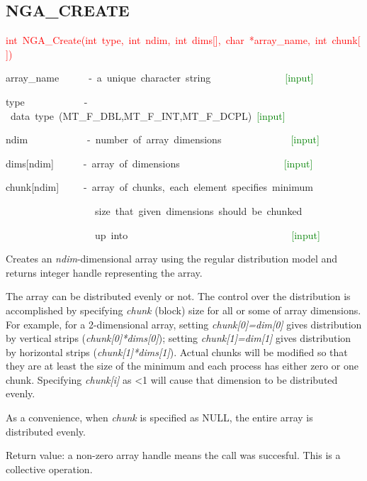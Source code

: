 \subsection*{\label{sub:NGA_CREATE}NGA\_CREATE}
\begin{lyxcode}
\textcolor{red}{int~NGA\_Create(int~type,~int~ndim,~int~dims{[}{]},~char~{*}array\_name,~int~chunk{[}{]})}



array\_name~~~~~~-~a~unique~character~string~~~~~~~~~~~~~~~\textcolor{green}{{[}input{]}~}

type~~~~~~~~~~~~-~data~type~(MT\_F\_DBL,MT\_F\_INT,MT\_F\_DCPL)~\textcolor{green}{{[}input{]}~}

ndim~~~~~~~~~~~~-~number~of~array~dimensions~~~~~~~~~~~~~~\textcolor{green}{{[}input{]}}~

dims{[}ndim{]}~~~~~~-~array~of~dimensions~~~~~~~~~~~~~~~~~~~~~\textcolor{green}{{[}input{]}~}

chunk{[}ndim{]}~~~~~-~array~of~chunks,~each~element~specifies~minimum~

~~~~~~~~~~~~~~~~~~size~that~given~dimensions~should~be~chunked~

~~~~~~~~~~~~~~~~~~up~into~~~~~~~~~~~~~~~~~~~~~~~~~~~~~~~~~\textcolor{green}{{[}input{]}}
\end{lyxcode}
Creates an \emph{ndim}-dimensional array using the regular distribution
model and returns integer handle representing the array.

The array can be distributed evenly or not. The control over the distribution
is accomplished by specifying \emph{chunk} (block) size for all or
some of array dimensions. For example, for a 2-dimensional array,
setting \emph{chunk{[}0{]}=dim{[}0{]}} gives distribution by vertical
strips (\emph{chunk{[}0{]}{*}dims{[}0{]}}); setting \emph{chunk{[}1{]}=dim{[}1{]}}
gives distribution by horizontal strips (\emph{chunk{[}1{]}{*}dims{[}1{]}}).
Actual chunks will be modified so that they are at least the size
of the minimum and each process has either zero or one chunk. Specifying
\emph{chunk{[}i{]} }as <1 will cause that dimension to be distributed
evenly.

As a convenience, when \emph{chunk} is specified as NULL, the entire
array is distributed evenly.

Return value: a non-zero array handle means the call was succesful.
This is a collective operation.


